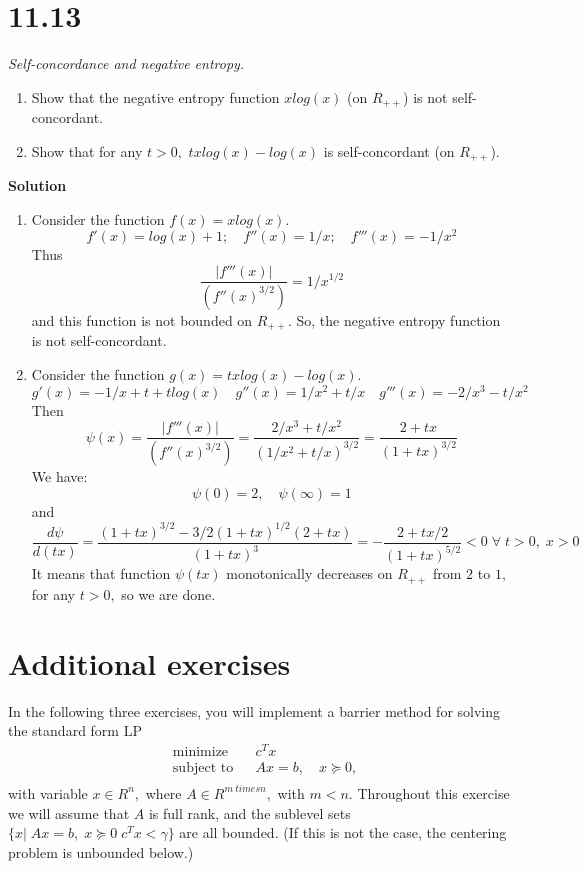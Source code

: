 \documentclass{article}
\begin{document}
\section*{11.13} 
\textit{Self-concordance and negative entropy.}
\begin{enumerate}[label=(\alph*)]
\item Show that the negative entropy function 
$x log(x)$ (on $R_{++}$) is not self-concordant.
\item Show that for any $t > 0,$ $t x log(x) - log(x)$ 
is self-concordant (on $R_{++}$).
\end{enumerate}

{\bf Solution}\\

\begin{enumerate}[label=(\alph*)]
	\item Consider the function 
	$f(x) = x log(x).$
	$$
	f'(x) = log(x) + 1; \quad
	f''(x) = 1/x; \quad
	f'''(x) = - 1/x^2
	$$
	Thus 
	$$
	\frac{|f'''(x)|}{(f''(x)^{3/2})} = 1/x^{1/2}
	$$
	and this function is not bounded on $R_{++}.$ 
	So, the negative entropy function is not self-concordant.
	
	\item Consider the function 
	$g(x) = t x log(x) - log(x).$ 
	$$
	g'(x) = - 1/x + t + t log(x) \quad
	g''(x) = 1/x^2 + t/x \quad
	g'''(x) = - 2 / x^3 - t / x^2
	$$
Then
$$
\psi(x) = \frac{|f'''(x)|}{(f''(x)^{3/2})} = 
\frac{2 / x^3 + t / x^2}{(1/x^2 + t/x)^{3/2}} =
\frac{2 + t x}{(1 + tx)^{3/2}}
$$	
We have:
$$
\psi(0) = 2, \quad \psi(\infty) = 1
$$
and 
$$
\frac{d \psi}{d(tx)} = 
\frac{(1 + tx)^{3/2} - 3/2 (1 + tx)^{1/2}(2 + tx)}{(1 +tx)^{3}}
= - \frac{2 + tx / 2}{(1 +tx)^{5/2}} < 0 \; \forall \; t > 0, \; x > 0 
$$
It means that 
function $\psi(tx)$ monotonically decreases on $R_{++}$ from $2$ to $1,$ for any $t > 0,$ so we are done. 

\end{enumerate}

\section*{Additional exercises} 

In the following three exercises, you will implement a barrier method for solving the standard
form LP
\begin{align*}
	&\text{minimize } && c^T x \\
	&\text{subject to} && Ax = b, \quad x \succeq 0,\\
\end{align*}
with variable $x \in R^n,$ where $A \in R^{m \ times n},$ with 
$m < n.$ Throughout this exercise we will
assume that $A$ is full rank, and the sublevel sets 
$\{x| \; Ax = b, \; x \succeq 0 \; c^T x < \gamma\}$ are all
bounded. (If this is not the case, the centering problem is unbounded below.)
\end{document}
